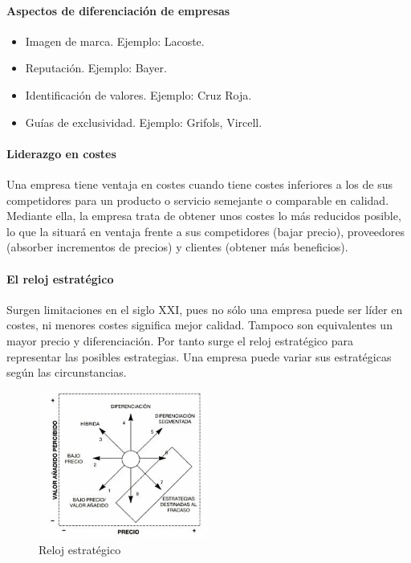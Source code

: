 \documentclass[12pt]{article}
\theoremstyle{definition_wo_parentheses}
\begin{document}
\paragraph{Aspectos de diferenciación de empresas}
\begin{itemize}
\item Imagen de marca. Ejemplo: Lacoste.
\item Reputación. Ejemplo: Bayer.
\item Identificación de valores. Ejemplo: Cruz Roja.
\item Guías de exclusividad. Ejemplo: Grifols, Vircell.
\end{itemize}

\paragraph{Liderazgo en costes} Una empresa tiene ventaja en costes cuando tiene costes inferiores a los de sus competidores para un producto o servicio semejante o comparable en calidad. Mediante ella, la empresa trata de obtener unos costes lo más reducidos posible, lo que la situará en ventaja frente a sus competidores (bajar precio), proveedores (absorber incrementos de precios) y clientes (obtener más beneficios).

\paragraph{El reloj estratégico} Surgen limitaciones en el siglo XXI, pues no sólo una empresa puede ser líder en costes, ni menores costes significa mejor calidad. Tampoco son equivalentes un mayor precio y diferenciación. Por tanto surge el reloj estratégico para representar las posibles estrategias. Una empresa puede variar sus estratégicas según las circunstancias. 

\begin{figure}[H]
 \centering
 \includegraphics[width=0.5\textwidth]{relojEstrategico}
 \caption{Reloj estratégico}
\end{figure}
\end{document}
